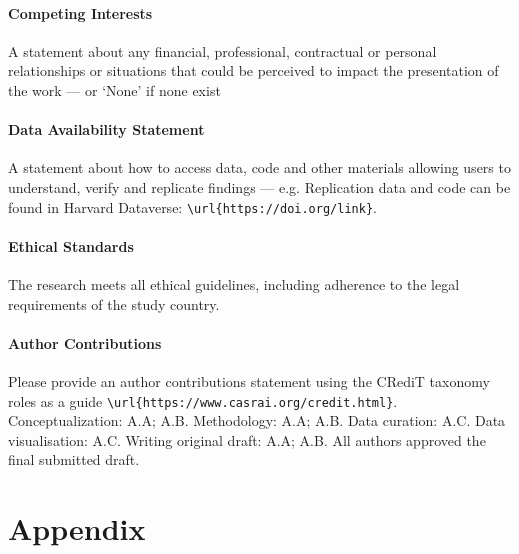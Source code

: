 \documentclass[
  journal=pasa,
  manuscript=research-paper,
  year=202X,
  volume=YY,
]{cup-journal}
\begin{document}
\paragraph{Competing Interests}
A statement about any financial, professional, contractual or personal relationships or situations that could be perceived to impact the presentation of the work --- or `None' if none exist

\paragraph{Data Availability Statement}
A statement about how to access data, code and other materials allowing users to understand, verify and replicate findings --- e.g. Replication data and code can be found in Harvard Dataverse: \verb+\url{https://doi.org/link}+.

\paragraph{Ethical Standards}
The research meets all ethical guidelines, including adherence to the legal requirements of the study country.

\paragraph{Author Contributions}
Please provide an author contributions statement using the CRediT taxonomy roles as a guide {\verb+\url{https://www.casrai.org/credit.html}+}. Conceptualization: A.A; A.B. Methodology: A.A; A.B. Data curation: A.C. Data visualisation: A.C. Writing original draft: A.A; A.B. All authors approved the final submitted draft.

\printendnotes


\appendix

\section{Appendix}
\end{document}
